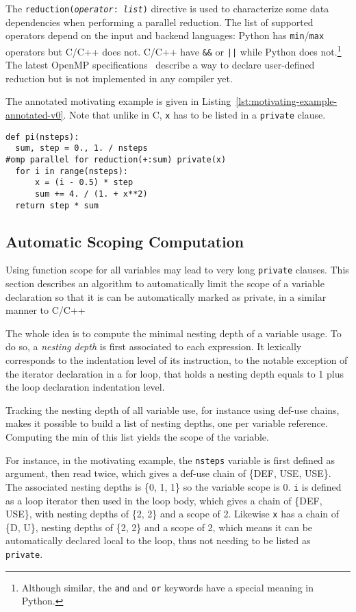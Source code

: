 \documentclass[conference]{IEEEtran}
\begin{document}
The \texttt{reduction(\emph{operator}: \emph{list})} directive is used to
characterize some data dependencies when performing a parallel reduction. The
list of supported operators depend on the input and backend languages: Python
has \texttt{min}/\texttt{max} operators but C/C++ does not. C/C++ have
\texttt{\&\&} or \texttt{||} while Python does not.\footnote{Although similar,
the \texttt{and} and \texttt{or} keywords have a special meaning in Python.} The
latest OpenMP specifications~\cite{openmp4} describe a way to declare
user-defined reduction but is not implemented in any compiler yet.

The annotated motivating example is given in
Listing~\ref{lst:motivating-example-annotated-v0}. Note that unlike in C,
\texttt{x} has to be listed in a \texttt{private} clause.

\begin{lstlisting}[float, label={lst:motivating-example-annotated-v0}, caption={Motivating
example: computing $\pi$ in Python with OpenMP.}]
def pi(nsteps):
  sum, step = 0., 1. / nsteps
#omp parallel for reduction(+:sum) private(x)
  for i in range(nsteps):
      x = (i - 0.5) * step
      sum += 4. / (1. + x**2)
  return step * sum
\end{lstlisting}

\subsection{Automatic Scoping Computation}

Using function scope for all variables may lead to very long \texttt{private}
clauses. This section describes an algorithm to automatically limit the scope of
a variable declaration so that it is can be automatically marked as private, in
a similar manner to C/C++

The whole idea is to compute the minimal nesting depth of a variable usage. To
do so, a \emph{nesting depth} is first associated to each expression. It
lexically corresponds to the indentation level of its instruction, to the
notable exception of the iterator declaration in a for loop, that holds a
nesting depth equals to 1 plus the loop declaration indentation level.

Tracking the nesting depth of all variable use, for instance using def-use
chains, makes it possible to build a list of nesting depths, one per variable
reference. Computing the min of this list yields the scope of the variable.

For instance, in the motivating example, the \texttt{nsteps} variable is first
defined as argument, then read twice, which gives a def-use chain of
\{DEF, USE, USE\}. The associated nesting depths is
\{0, 1, 1\} so the variable scope is 0. \texttt{i} is defined as a loop iterator then
used in the loop body, which gives a chain of \{DEF, USE\}, with nesting
depths of \{2, 2\} and a scope of 2. Likewise \texttt{x} has a chain
of \{D, U\}, nesting depths of \{2, 2\} and a scope of 2, which means it can be
automatically declared local to the loop, thus not needing to be listed as
\texttt{private}.
\end{document}
